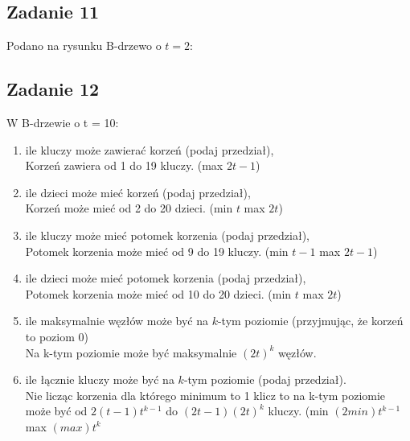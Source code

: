\documentclass{article}
\begin{document}
\subsection*{Zadanie 11}
Podano na rysunku B-drzewo o $t=2$:

\subsection*{Zadanie 12}
W B-drzewie o t = 10:
\begin{enumerate}[label=(\alph*)]
    \item ile kluczy może zawierać korzeń (podaj przedział), \\
          Korzeń zawiera od 1 do 19 kluczy. (max $2t-1$)
    \item ile dzieci może mieć korzeń (podaj przedział), \\
          Korzeń może mieć od 2 do 20 dzieci. (min $t$ max $2t$)
    \item ile kluczy może mieć potomek korzenia (podaj przedział), \\
          Potomek korzenia może mieć od 9 do 19 kluczy. (min $t-1$ max $2t-1$)
    \item ile dzieci może mieć potomek korzenia (podaj przedział), \\
          Potomek korzenia może mieć od 10 do 20 dzieci. (min $t$ max $2t$)
    \item ile maksymalnie węzłów może być na $k$-tym poziomie (przyjmując, że korzeń to poziom $0$) \\
          Na k-tym poziomie może być maksymalnie $(2t)^k$ węzłów.
    \item ile łącznie kluczy może być na $k$-tym poziomie (podaj przedział). \\
          Nie licząc korzenia dla którego minimum to 1 klicz to na k-tym poziomie może być od $2(t-1)t^{k-1}$ do $(2t-1)(2t)^{k}$ kluczy. (min $(2min)t^{k-1}$ max $(max)t^{k}$
\end{enumerate}
\end{document}
